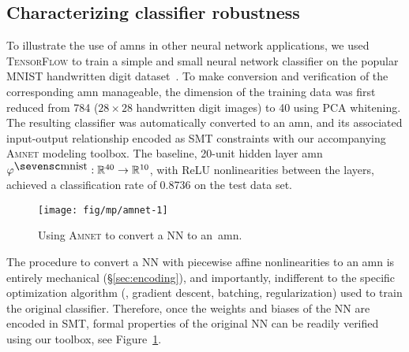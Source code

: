 %
%


\subsection{Characterizing classifier robustness}
To illustrate the use of \acsp{amn} in other neural network applications, we
used \textsc{TensorFlow} to train a simple and small neural network classifier
on the popular MNIST handwritten digit
dataset~\cite{TensorFlow:2015,LeCun:1998}.  To make conversion and verification
of the corresponding \acs{amn}
manageable, the dimension of the training data was first reduced from 784 
($28\times28$ handwritten digit images) to 40 using PCA whitening.
The resulting classifier was automatically converted to an \acs{amn}, and its
associated input-output relationship encoded as SMT constraints with our
accompanying \textsc{Amnet} modeling
toolbox.
The baseline, 20-unit hidden layer \acs{amn} 
$\amn^\mathsc{mnist}:\reals^{40}\to\reals^{10}$,
with ReLU nonlinearities between the
layers, achieved a classification rate of 
0.8736
on the test data set.

\begin{figure}[htbp]
    \centering
    \texttt{[image: fig/mp/amnet-1]}
    \caption{Using \textsc{Amnet} to convert a NN to an~\acs{amn}.}
    \label{fig:amnet1}
\end{figure}


The procedure to convert a NN with piecewise affine nonlinearities to an
\acs{amn} is entirely mechanical (\S{}\ref{sec:encoding}), and importantly,
indifferent to the specific optimization algorithm (\eg, gradient descent,
batching, regularization) used to train the original classifier. Therefore,
once the weights and biases of the NN are encoded in SMT, formal properties
of the original NN can be readily verified using our toolbox, see
Figure~\ref{fig:amnet1}.

